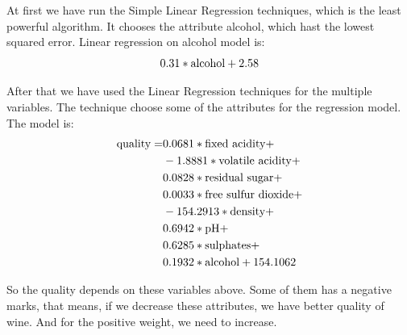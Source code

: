 \documentclass[a4paper]{article}
\begin{document}
At first we have run the Simple Linear Regression techniques, which is the least powerful algorithm. It chooses the attribute alcohol, which hast the lowest squared error. Linear regression on alcohol model is: 
\begin{equation*}
    0.31 * \textnormal{alcohol} + 2.58
\end{equation*}

After that we have used the Linear Regression techniques for the multiple variables. The technique choose some of the attributes for the regression model. The model is:
\begin{align*}
    \textnormal{quality} = &0.0681 * \textnormal{fixed acidity} +\\
                           &-1.8881 * \textnormal{volatile acidity} +\\
                           & 0.0828 * \textnormal{residual sugar} +\\
                           & 0.0033 * \textnormal{free sulfur dioxide} +\\
                           &-154.2913 * \textnormal{density} +\\
                           &0.6942 * \textnormal{pH} +\\
                           &0.6285 * \textnormal{sulphates} +\\
                           &0.1932 * \textnormal{alcohol} + 154.1062\\
\end{align*}

So the quality depends on these variables above. Some of them has a negative marks, that means, if we decrease these attributes, we have better quality of wine. And for the positive weight, we need to increase.
\end{document}
